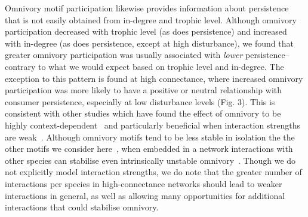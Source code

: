 \documentclass[12pt]{article}
\begin{document}
\begin{spacing}{2.0}
    Omnivory motif participation likewise provides information about persistence that is not easily obtained from in-degree and trophic level.
    Although omnivory participation decreased with trophic level (as does persistence) and increased with in-degree (as does persistence, except at high disturbance), we found that greater omnivory participation was usually associated with \emph{lower} persistence-- contrary to what we would expect based on trophic level and in-degree.
    The exception to this pattern is found at high connectance, where increased omnivory participation was more likely to have a positive or neutral relationship with consumer persistence, especially at low disturbance levels (Fig. 3).
    This is consistent with other studies which have found the effect of omnivory to be highly context-dependent~\citep{bascompte2005simple, Monteiro2016} and particularly beneficial when interaction strengths are weak~\citep{Emmerson2004}.
    Although omnivory motifs tend to be less stable in isolation the the other motifs we consider here~\citep{Borrelli2015a}, when embedded in a network interactions with other species can stabilise even intrinsically unstable omnivory~\citep{Kratina2012}.
    Though we do not explicitly model interaction strengths, we do note that the greater number of interactions per species in high-connectance networks should lead to weaker interactions in general, as well as allowing many opportunities for additional interactions that could stabilise omnivory.
    

    
    


\end{spacing}
\end{document}
